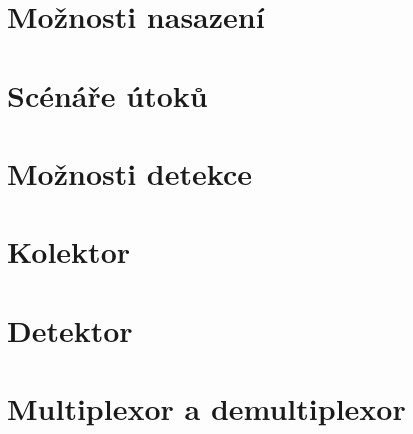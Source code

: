  \section{Možnosti nasazení}
 \section{Scénáře útoků}
 \section{Možnosti detekce}
 \section{Kolektor}
 \section{Detektor}
 \section{Multiplexor a demultiplexor}
